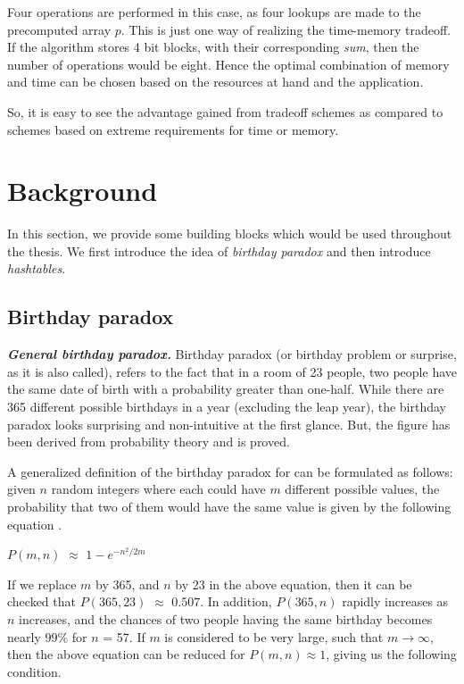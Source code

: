 Four operations are performed in this case, as four lookups are made to the precomputed array $p$. This is just one way of realizing the time-memory tradeoff. If the algorithm stores 4 bit blocks, with their corresponding \textit{sum}, then the number of operations would be eight. Hence the optimal combination of memory and time can be chosen based on the resources at hand and the application. 

So, it is easy to see the advantage gained from tradeoff schemes as compared to schemes based on extreme requirements for time or memory. 

\section{Background}

In this section, we provide some building blocks which would be used throughout the thesis. We first introduce the idea of \textit{birthday paradox} and then introduce \textit{hashtables}.

\subsection{Birthday paradox}
\label{sec:bday-paradox}

\indent \textit{\textbf{General birthday paradox.}} Birthday paradox (or birthday problem or surprise, as it is also called), refers to the fact that in a room of 23 people, two people have the same date of birth with a probability greater than one-half. While there are 365 different possible birthdays in a year (excluding the leap year), the birthday paradox looks surprising and non-intuitive at the first glance. But, the figure has been derived from probability theory and is proved. 

A generalized definition of the birthday paradox for can be formulated as follows: given $n$ random integers where each could have $m$ different possible values, the probability that two of them would have the same value is given by the following equation \cite{menezes}.

\begin{center}
$P(m,n)$ $\approx$ $1 - e^{-{n^2}/{2m}}$
\end{center}

If we replace $m$ by 365, and $n$ by 23 in the above equation, then it can be checked that $P(365,23)$ $\approx$ $0.507$. In addition, $P(365,n)$ rapidly increases as $n$ increases, and the chances of two people having the same birthday becomes nearly $99 \%$ for $n$ = 57. If $m$ is considered to be very large, such that $m \rightarrow \infty$, then the above equation can be reduced for $P(m,n) \approx 1$, giving us the following condition. 


